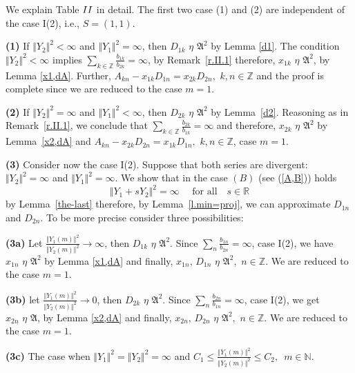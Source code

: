 \documentclass[preprint,12pt]{elsarticle}
\numberwithin{equation}{section}
\begin{document}
We explain  Table ${\rm II}$ in detail. 
%
 The first two case (1) and (2) are independent
of the case {\rm I(2)}, i.e.,
$S=(1,1)$.
%

{\bf (1)} If $\Vert Y_2 \Vert^2<\infty$ and $\Vert Y_1 \Vert^2=\infty$, then
 $D_{1k}\,\,\eta\,\,{\mathfrak A}^2$ by Lemma \ref{d1}. The
condition $\Vert Y_2 \Vert^2<\infty$ implies $\sum_{k\in{\mathbb
Z}}\frac{b_{1k}}{b_{2k}}=\infty$, by  Remark~\ref{r.II.1}
therefore, $x_{1k}\,\,\eta\,\,{\mathfrak A}^2$,  by Lemma
\ref{x1,dA}. Further, $A_{kn}-x_{1k}D_{1n}=x_{2k}D_{2n},\,\,k,n\in
{\mathbb Z}$ and the proof is complete since we are reduced to the
case $m=1$.

%
{\bf (2)} If $\Vert Y_2 \Vert^2=\infty$ and $\Vert Y_1 \Vert^2<\infty$, then
  $D_{2k}\,\,\eta\,\,{\mathfrak A}^2$ by Lemma~\ref{d2}. 
Reasoning as in  
 Remark~\ref{r.II.1}, we conclude that $\sum_{k\in{\mathbb Z}}\frac{b_{2k}}{b_{1k}}=\infty$ and therefore,
 $x_{2k}\,\,\eta\,\,{\mathfrak A}^2$ by Lemma~\ref{x2,dA} and $A_{kn}-x_{2k}D_{2n}=x_{1k}D_{1n},\,\,k,n\in {\mathbb Z}$, case $m=1$.

%
{\bf (3)}  Consider now the case  I(2). 
Suppose that both series are divergent: $\Vert Y_2 \Vert^2\!=\!\infty$ and
$\Vert Y_1 \Vert^2\!=\!\infty$.  We show that in the case $(B)$   {\rm (see (\ref{A,B}))} holds $$\Vert Y_1+sY_2\Vert^2\!=\!\infty\quad\text{ for all}\quad s\in {\mathbb R}$$
by Lemma~\ref{the-last} therefore, 
by Lemma~\ref{l.min=proj}, we can approximate $D_{1n}$ and $D_{2n}$.
To be more precise  consider three possibilities:



{\bf (3a)} Let $\frac{\Vert Y_1(m)\Vert^2}{\Vert Y_2(m)\Vert^2}\to\infty$, then
$D_{1k}\,\,\eta\,\,{\mathfrak A}^2$. Since $\sum_n\frac{b_{1n}}{b_{2n}}=\infty$, case I(2), we have
$x_{1n}\,\,\eta\,\,{\mathfrak A}^2$ by  Lemma \ref{x1,dA} and
finally, $x_{1n},\,D_{1n}\,\,\eta\,\,{\mathfrak A}^2,\,\,n\in
{\mathbb Z}$. We are reduced to the case $m=1$. 
 


{\bf (3b)}  let $\frac{\Vert Y_1(m)\Vert^2}{\Vert Y_2(m)\Vert^2}\to 0$, then
$D_{2k}\,\,\eta\,\,{\mathfrak A}^2$.  Since
$\sum_n\frac{b_{2n}}{b_{1n}}=\infty$, case I(2), we get
$x_{2n}\,\,\eta\,\,{\mathfrak A}$, by  Lemma \ref{x2,dA} and
finally, $x_{2n},\,D_{2n}\,\,\eta\,\,{\mathfrak A}^2,\,\,n\in
{\mathbb Z}$. We are reduced to the case $m=1$.




{\bf (3c)} The case when  $\Vert Y_1 \Vert^2\!=\!\Vert Y_2 \Vert^2\!=\!\infty$ and $C_1\!\leq
\frac{\Vert Y_1(m)\Vert^2}{\Vert Y_2(m)\Vert^2}\leq C_2,\,\,\,
m\in \mathbb N$.
\end{document}
